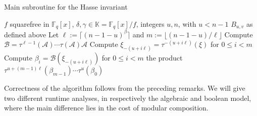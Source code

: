 \documentclass[12pt]{article}
\theoremstyle{plain}
\theoremstyle{definition}
\def\F{\ensuremath{\mathbb{F}}}
\def\K{\ensuremath{\mathbb{K}}}
\begin{document}
\begin{algorithm}[H]
  \caption{Main subroutine for the Hasse invariant}
  \label{alg:hasse-inv}
  \begin{algorithmic}[1]
    \REQUIRE $f$ squarefree in $\F_q[x]$,  $\delta, \gamma \in \K=\F_q[x]/f$, integers $u,n$, with $u < n-1$
    \ENSURE $B_{u,v}$ as defined above
    \STATE Let $\ell := \lceil (n-1-u)^\beta \rceil$ and $m := \lfloor (n-1-u) / \ell \rfloor$
    \STATE\label{step:hasse-2}
    Compute $\mathcal{B} = \tau^{\ell-1}(\mathcal{A}) \cdots \tau(\mathcal{A}) \mathcal{A}$
    \STATE\label{step:hasse-3}
    Compute $\xi_{-(u+i\ell)} = \tau^{-(u+i\ell)}(\xi)$ for $0 \le i < m$
    \STATE\label{step:hasse-4}
    Compute $\beta_i = \mathcal{B}(\xi_{-(u+i\ell)})$ for $0 \le i< m$
    \RETURN\label{step:hasse-5}  the product $\tau^{u+(m-1)\ell}(\beta_{m-1})\cdots \tau^u(\beta_0)$
  \end{algorithmic}
\end{algorithm}

Correctness of the algorithm follows from the preceding remarks.  We
will give two different runtime analyses, in respectively the
algebraic and boolean model, where the main difference lies in the
cost of modular composition. 
\end{document}
